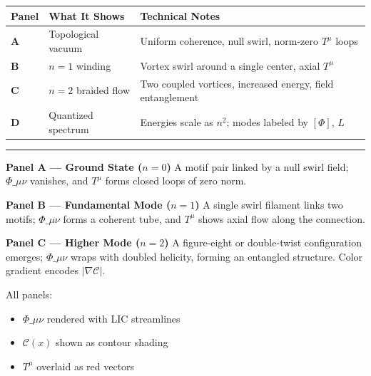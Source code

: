\documentclass[
  11pt,
]{article}
\providecommand{\tightlist}{%
  \setlength{\itemsep}{0pt}\setlength{\parskip}{0pt}}
\begin{document}
\begin{longtable}[]{@{}
  >{\raggedright\arraybackslash}p{}
  >{\raggedright\arraybackslash}p{}
  >{\raggedright\arraybackslash}p{}@{}}
\toprule\noalign{}
\begin{minipage}[b]{\linewidth}\raggedright
Panel
\end{minipage} & \begin{minipage}[b]{\linewidth}\raggedright
What It Shows
\end{minipage} & \begin{minipage}[b]{\linewidth}\raggedright
Technical Notes
\end{minipage} \\
\midrule\noalign{}
\endhead
\bottomrule\noalign{}
\endlastfoot
\textbf{A} & Topological vacuum & Uniform coherence, null swirl,
norm-zero \(T^\mu\) loops \\
\textbf{B} & \(n=1\) winding & Vortex swirl around a single center,
axial \(T^\mu\) \\
\textbf{C} & \(n=2\) braided flow & Two coupled vortices, increased
energy, field entanglement \\
\textbf{D} & Quantized spectrum & Energies scale as \(n^2\); modes
labeled by \([\Phi]\), \(L\) \\
\end{longtable}

\begin{center}\rule{0.5\linewidth}{0.5pt}\end{center}

\textbf{Panel A --- Ground State (\(n=0\))} A motif pair linked by a
null swirl field; \(\Phi\_{\mu\nu}\) vanishes, and \(T^\mu\) forms
closed loops of zero norm.

\textbf{Panel B --- Fundamental Mode (\(n=1\))} A single swirl filament
links two motifs; \(\Phi\_{\mu\nu}\) forms a coherent tube, and
\(T^\mu\) shows axial flow along the connection.

\textbf{Panel C --- Higher Mode (\(n=2\))} A figure-eight or
double-twist configuration emerges; \(\Phi\_{\mu\nu}\) wraps with
doubled helicity, forming an entangled structure. Color gradient encodes
\(|\nabla \mathcal{C}|\).

All panels:

\begin{itemize}
\tightlist
\item
  \(\Phi\_{\mu\nu}\) rendered with LIC streamlines
\item
  \(\mathcal{C}(x)\) shown as contour shading
\item
  \(T^\mu\) overlaid as red vectors
\end{itemize}
\end{document}
